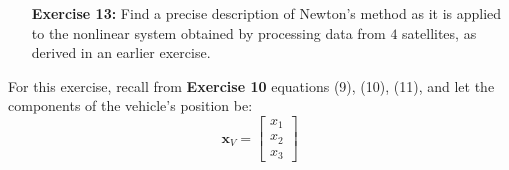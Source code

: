 \documentclass[11pt]{article}
\theoremstyle{definition}
\newcommand{\1}[1]{\mathbf{1} \left \{ #1 \right \}}
\begin{document}
\begin{itemize}
\item[{\textbf{Exercise 13:}}] Find a precise description of Newton's method as it is applied to the nonlinear system obtained by processing data from $4$ satellites, as derived in an earlier exercise.
\end{itemize}
For this exercise, recall from \textbf{Exercise 10} equations (9), (10), (11), and let the components of the vehicle's position be:
\[\textbf{x}_V = \begin{bmatrix}
x_1 \\ x_2 \\ x_3 \end{bmatrix}\]
\end{document}
